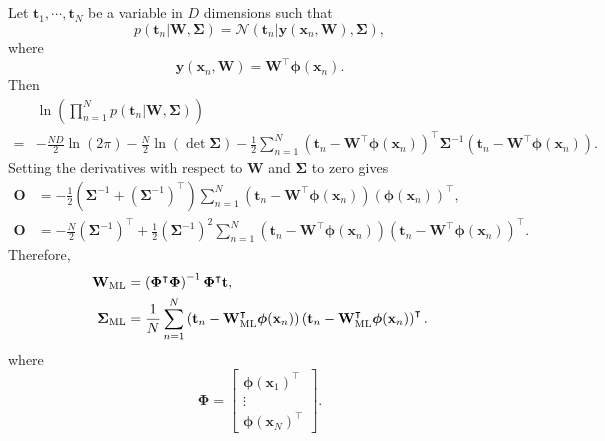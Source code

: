 \subsection{}
\label{3.6}
Let $\mathbf{t}_1, \cdots, \mathbf{t}_N$ be a variable in $D$ dimensions such that 
%
\begin{equation}
p(\mathbf{t}_n | \mathbf{W}, \bm{\Sigma})
=
\mathcal{N}
\left(
	\mathbf{t}_n
	|
	\mathbf{y} (\mathbf{x}_n, \mathbf{W}),
	\bm{\Sigma}
\right),
\end{equation}
%
where
%
\begin{equation}
\mathbf{y} (\mathbf{x}_n, \mathbf{W})
=
\mathbf{W} ^ \intercal
\bm{\phi}(\mathbf{x}_n).
\end{equation}
%
Then
%
\begin{equation}
\begin{aligned}
&
\ln
\left(
	\prod_{n = 1}^{N}
	p(\mathbf{t}_n | \mathbf{W}, \bm{\Sigma})
\right)
\\
=&
-
\frac{N D}{2}
\ln (2 \pi)
-
\frac{N}{2}
\ln (\det \bm{\Sigma})
-
\frac{1}{2}
\sum_{n = 1}^{N}
\left(
	\mathbf{t}_n 
	- 
	\mathbf{W} ^ \intercal
	\bm{\phi}(\mathbf{x}_n)
\right) ^ \intercal
\bm{\Sigma} ^ {- 1}
\left(
	\mathbf{t}_n 
	- 
	\mathbf{W} ^ \intercal
	\bm{\phi}(\mathbf{x}_n)
\right).
\end{aligned}
\end{equation}
%
Setting the derivatives with respect to $\mathbf{W}$ and $\bm{\Sigma}$ to zero gives
%
\begin{equation}
\begin{aligned}
\mathbf{O}
&=
-
\frac{1}{2}
\left(
	\bm{\Sigma} ^ {- 1} 
	+
	\left(
		\bm{\Sigma} ^ {- 1}
	\right) ^ \intercal
\right)
\sum_{n = 1}^{N}
\left(
	\mathbf{t}_n 
	- 
	\mathbf{W} ^ \intercal
	\bm{\phi}(\mathbf{x}_n)
\right)
\left(
	\bm{\phi}(\mathbf{x}_n)
\right) ^ \intercal,
\\
\mathbf{O}
&=
-
\frac{N}{2}
\left(
	\bm{\Sigma} ^ {- 1}
\right) ^ \intercal
+
\frac{1}{2}
\left(
	\bm{\Sigma} ^ {- 1}
\right) ^ 2
\sum_{n = 1}^{N}
\left(
	\mathbf{t}_n 
	- 
	\mathbf{W} ^ \intercal
	\bm{\phi}(\mathbf{x}_n)
\right)
\left(
	\mathbf{t}_n 
	- 
	\mathbf{W} ^ \intercal
	\bm{\phi}(\mathbf{x}_n)
\right) ^ \intercal.
\end{aligned}
\end{equation}
%
Therefore,
%
\begin{equation}
\begin{aligned}
\mathbf{W}_{\rm ML}
&=
\left(
	\bm{\Phi} ^ \intercal
	\bm{\Phi}
\right) ^ {- 1}
\bm{\Phi} ^ \intercal
\mathbf{t},
\\
\bm{\Sigma}_{\rm ML}
&=
\frac{1}{N}
\sum_{n = 1}^{N}
\left(
	\mathbf{t}_n 
	- 
	\mathbf{W}_{\rm ML} ^ \intercal
	\bm{\phi}(\mathbf{x}_n)
\right)
\left(
	\mathbf{t}_n 
	- 
	\mathbf{W}_{\rm ML} ^ \intercal
	\bm{\phi}(\mathbf{x}_n)
\right) ^ \intercal.
\end{aligned}
\end{equation}
%
where
%
\[
\bm{\Phi}
=
\begin{bmatrix}
\bm{\phi} (\mathbf{x}_1) ^ \intercal 
\\
\vdots 
\\
\bm{\phi} (\mathbf{x}_N) ^ \intercal
\end{bmatrix}
.
\]


